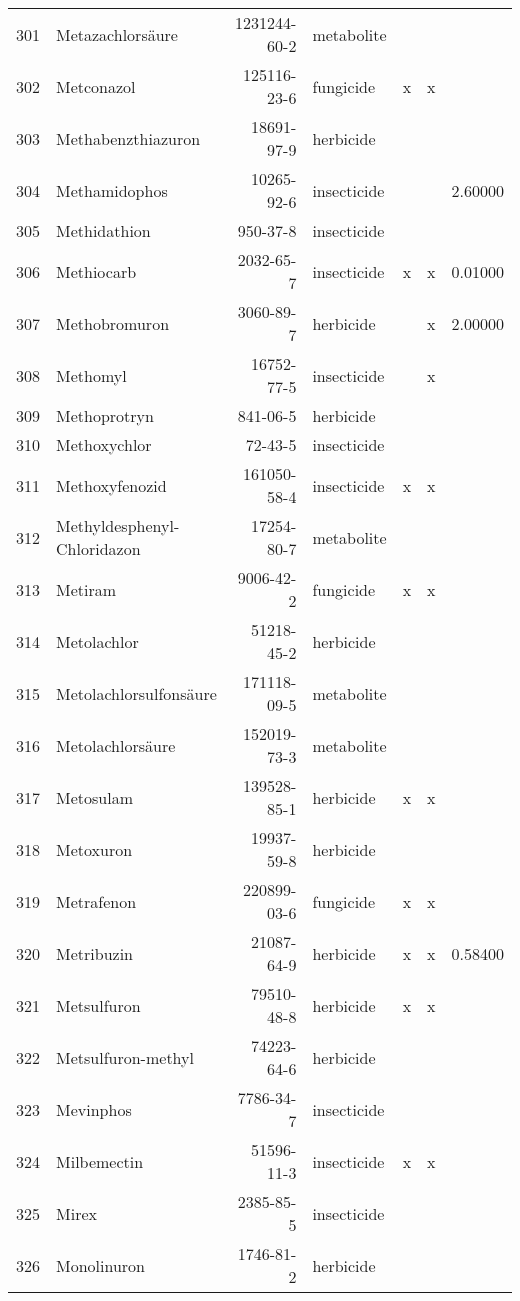 \begin{longtable}{lp{3cm}rlp{1cm}p{1cm}p{1.5cm}}
  301 & Metazachlorsäure & 1231244-60-2 & metabolite &  &  &  \\ 
  302 & Metconazol & 125116-23-6 & fungicide & x & x &  \\ 
  303 & Methabenzthiazuron & 18691-97-9 & herbicide &  &  &  \\ 
  304 & Methamidophos & 10265-92-6 & insecticide &  &  & 2.60000 \\ 
  305 & Methidathion & 950-37-8 & insecticide &  &  &  \\ 
  306 & Methiocarb & 2032-65-7 & insecticide & x & x & 0.01000 \\ 
  307 & Methobromuron & 3060-89-7 & herbicide &  & x & 2.00000 \\ 
  308 & Methomyl & 16752-77-5 & insecticide &  & x &  \\ 
  309 & Methoprotryn & 841-06-5 & herbicide &  &  &  \\ 
  310 & Methoxychlor & 72-43-5 & insecticide &  &  &  \\ 
  311 & Methoxyfenozid & 161050-58-4 & insecticide & x & x &  \\ 
  312 & Methyldesphenyl-Chloridazon & 17254-80-7 & metabolite &  &  &  \\ 
  313 & Metiram & 9006-42-2 & fungicide & x & x &  \\ 
  314 & Metolachlor & 51218-45-2 & herbicide &  &  &  \\ 
  315 & Metolachlor\-sulfonsäure & 171118-09-5 & metabolite &  &  &  \\ 
  316 & Metolachlorsäure & 152019-73-3 & metabolite &  &  &  \\ 
  317 & Metosulam & 139528-85-1 & herbicide & x & x &  \\ 
  318 & Metoxuron & 19937-59-8 & herbicide &  &  &  \\ 
  319 & Metrafenon & 220899-03-6 & fungicide & x & x &  \\ 
  320 & Metribuzin & 21087-64-9 & herbicide & x & x & 0.58400 \\ 
  321 & Metsulfuron & 79510-48-8 & herbicide & x & x &  \\ 
  322 & Metsulfuron-methyl & 74223-64-6 & herbicide &  &  &  \\ 
  323 & Mevinphos & 7786-34-7 & insecticide &  &  &  \\ 
  324 & Milbemectin & 51596-11-3 & insecticide & x & x &  \\ 
  325 & Mirex & 2385-85-5 & insecticide &  &  &  \\ 
  326 & Monolinuron & 1746-81-2 & herbicide &  &  &  \\ 

\end{longtable}

